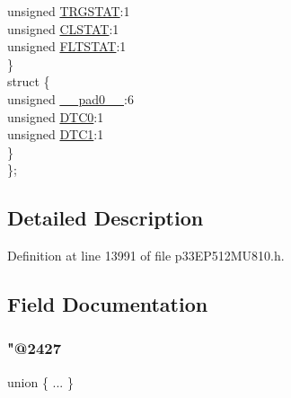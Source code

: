\begin{DoxyCompactItemize}
\begin{tabbing}
\>\>unsigned \hyperlink{structtag_p_w_m_c_o_n1_b_i_t_s_a57c6135a12bae69a2a2cac5ed50a4a6d}{TRGSTAT}:1\\
\>\>unsigned \hyperlink{structtag_p_w_m_c_o_n1_b_i_t_s_a3ff6da0b6372a30fc64f07d769a3ddab}{CLSTAT}:1\\
\>\>unsigned \hyperlink{structtag_p_w_m_c_o_n1_b_i_t_s_ac4cd94e1f740f5bc85b265ed453769f0}{FLTSTAT}:1\\
\>\} \\
\>struct \{\\
\>\>unsigned \hyperlink{structtag_p_w_m_c_o_n1_b_i_t_s_adf71f3d8410c1f1dbbc96680a92c49af}{\_\_pad0\_\_}:6\\
\>\>unsigned \hyperlink{structtag_p_w_m_c_o_n1_b_i_t_s_a9aea5589386f8c7d9cb07683fc730825}{DTC0}:1\\
\>\>unsigned \hyperlink{structtag_p_w_m_c_o_n1_b_i_t_s_a41e45e30f2c99c731b1d2bca6060d8ad}{DTC1}:1\\
\>\} \\
\}; \\

\end{tabbing}\end{DoxyCompactItemize}


\subsection{Detailed Description}


Definition at line 13991 of file p33\+E\+P512\+M\+U810.\+h.



\subsection{Field Documentation}
\mbox{\label{structtag_p_w_m_c_o_n1_b_i_t_s_a964cb922e5a92019c79f7c4ce08d33e9}} 
\subsubsection{\texorpdfstring{"@2427}{@2427}}
{\footnotesize\ttfamily union \{ ... \} }

\mbox{\label{structtag_p_w_m_c_o_n1_b_i_t_s_adf71f3d8410c1f1dbbc96680a92c49af}} 
